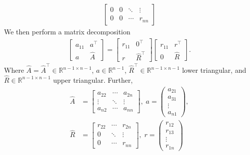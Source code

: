 \documentclass{report}
\begin{document}
\begin{itemize}
\begin{align*}
\begin{bmatrix}
                    0 & 0 & \ddots & \vdots \\
                    0 & 0  & \cdots & r_{nn}
                \end{bmatrix}
            \end{align*}
            We then perform a matrix decomposition 
            \begin{align*}
                \begin{bmatrix}
                    a_{11} & a^{\top} \\
                    a & \hat{A}
                \end{bmatrix}
                =
                \begin{bmatrix}
                    r_{11} & 0^{\top} \\
                    r & \hat{R}^{\top}
                \end{bmatrix}
                \begin{bmatrix}
                    r_{11} & r^{\top} \\
                    0 & \hat{R}
                \end{bmatrix}
            .\end{align*}
            Where $\hat{A} = \hat{A}^{\top} \in \mathbb{R}^{n-1 \times n-1}$, $a \in \mathbb{R}^{n-1}$, $\hat{R}^{\top} \in \mathbb{R}^{n-1\times n-1}$ lower triangular, and $\hat{R} \in \mathbb{R}^{n-1\times n-1}$ upper triangular. Further,
            \begin{align*}
                \hat{A} &= \begin{bmatrix} a_{22} & \cdots & a_{2n} \\ \vdots & \ddots & \vdots \\ a_{n2} & \cdots & a_{nn} \end{bmatrix},\; a = \begin{pmatrix} a_{21} \\ a_{31} \\ \vdots \\ a_{n1} \end{pmatrix}, \\
                \hat{R} &= \begin{bmatrix} r_{22} &  \cdots & r_{2n} \\ 0 & \ddots & \vdots \\ 0  & \cdots & r_{nn} \end{bmatrix},\; r = \begin{pmatrix} r_{12} \\ r_{13} \\ \vdots \\ r_{1n} \end{pmatrix} 

\end{align*}
\end{itemize}
\end{document}
